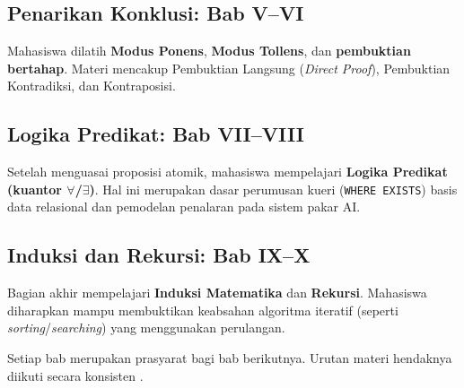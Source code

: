 \subsection{Penarikan Konklusi: Bab V--VI}
Mahasiswa dilatih \textbf{Modus Ponens}, \textbf{Modus Tollens}, dan \textbf{pembuktian bertahap}. Materi mencakup Pembuktian Langsung (\textit{Direct Proof}), Pembuktian Kontradiksi, dan Kontraposisi.

\subsection{Logika Predikat: Bab VII--VIII}
Setelah menguasai proposisi atomik, mahasiswa mempelajari \textbf{Logika Predikat (kuantor $\forall$/$\exists$)}. Hal ini merupakan dasar perumusan kueri (\texttt{WHERE EXISTS}) basis data relasional dan pemodelan penalaran pada sistem pakar AI.

\subsection{Induksi dan Rekursi: Bab IX--X}
Bagian akhir mempelajari \textbf{Induksi Matematika} dan \textbf{Rekursi}. Mahasiswa diharapkan mampu membuktikan keabsahan algoritma iteratif (seperti \textit{sorting}/\textit{searching}) yang menggunakan perulangan.

Setiap bab merupakan prasyarat bagi bab berikutnya. Urutan materi hendaknya diikuti secara konsisten \cite{levin_discrete,rosen2019}.

